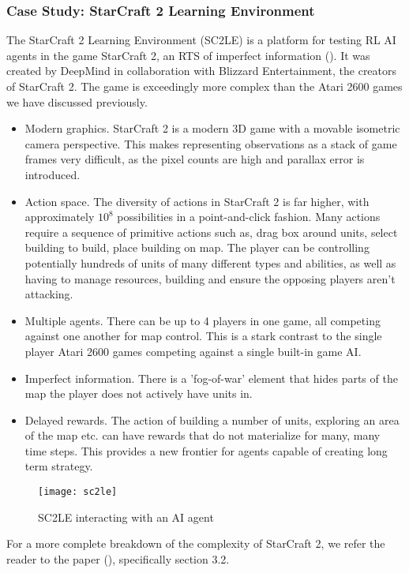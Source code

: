 \subsubsection{Case Study: StarCraft 2 Learning Environment}
The StarCraft 2 Learning Environment (SC2LE) is a platform for testing RL AI agents in the game StarCraft 2, an RTS of imperfect information (\citet{starcraft}). It was created by DeepMind in collaboration with Blizzard Entertainment, the creators of StarCraft 2. The game is exceedingly more complex than the Atari 2600 games we have discussed previously.
\begin{itemize}
    \item Modern graphics. StarCraft 2 is a modern 3D game with a movable isometric camera perspective. This makes representing observations as a stack of game frames very difficult, as the pixel counts are high and parallax error is introduced.
    \item  Action space. The diversity of actions in StarCraft 2 is far higher, with approximately $10^8$ possibilities in a point-and-click fashion. Many actions require a sequence of primitive actions such as, drag box around units, select building to build, place building on map. The player can be controlling potentially hundreds of units of many different types and abilities, as well as having to manage resources, building and ensure the opposing players aren't attacking.
    \item Multiple agents. There can be up to 4 players in one game, all competing against one another for map control. This is a stark contrast to the single player Atari 2600 games competing against a single built-in game AI.
    \item Imperfect information. There is a 'fog-of-war' element that hides parts of the map the player does not actively have units in.
    \item Delayed rewards. The action of building a number of units, exploring an area of the map etc. can have rewards that do not materialize for many, many time steps. This provides a new frontier for agents capable of creating long term strategy.
\end{itemize}

\begin{figure}[H]
    \centering
    \texttt{[image: sc2le]}
    \caption{SC2LE interacting with an AI agent}
\end{figure}

For a more complete breakdown of the complexity of StarCraft 2, we refer the reader to the paper (\citet{starcraft}), specifically section 3.2. \paragraph{}


